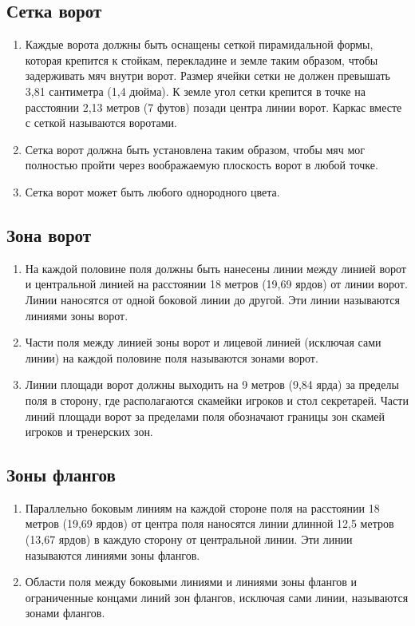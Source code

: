 \documentclass[../main.tex]{subfiles}
\begin{document}
\subsection{Сетка ворот}
\begin{enumerate}
  \item Каждые ворота должны быть оснащены сеткой пирамидальной формы, которая крепится к стойкам, перекладине и земле таким образом, чтобы задерживать мяч внутри ворот.\newline
  Размер ячейки сетки не должен превышать 3,81 сантиметра (1,4 дюйма).\newline
  К земле угол сетки крепится в точке на расстоянии 2,13 метров (7 футов) позади центра линии ворот.\newline
  Каркас вместе с сеткой называются воротами.
  \item Сетка ворот должна быть установлена таким образом, чтобы мяч мог полностью пройти через воображаемую плоскость ворот в любой точке.
  \item Сетка ворот может быть любого однородного цвета.
\end{enumerate}

\subsection{Зона ворот}
\begin{enumerate}
  \item На каждой половине поля должны быть нанесены линии между линией ворот и центральной линией на расстоянии 18 метров (19,69 ярдов) от линии ворот. Линии наносятся от одной боковой линии до другой. Эти линии называются линиями зоны ворот.
  \item Части поля между линией зоны ворот и лицевой линией (исключая сами линии) на каждой половине поля называются зонами ворот.
  \item Линии площади ворот должны выходить на 9 метров (9,84 ярда) за пределы поля в сторону, где располагаются скамейки игроков и стол секретарей. Части линий площади ворот за пределами поля обозначают границы зон скамей игроков и тренерских зон.
\end{enumerate}

\subsection{Зоны флангов}
\begin{enumerate}
  \item Параллельно боковым линиям на каждой стороне поля на расстоянии 18 метров (19,69 ярдов) от центра поля наносятся линии длинной 12,5 метров (13,67 ярдов) в каждую сторону от центральной линии. Эти линии называются линиями зоны флангов.
  \item Области поля между боковыми линиями и линиями зоны флангов и ограниченные концами линий зон флангов, исключая сами линии, называются зонами флангов.
\end{enumerate}
\end{document}
